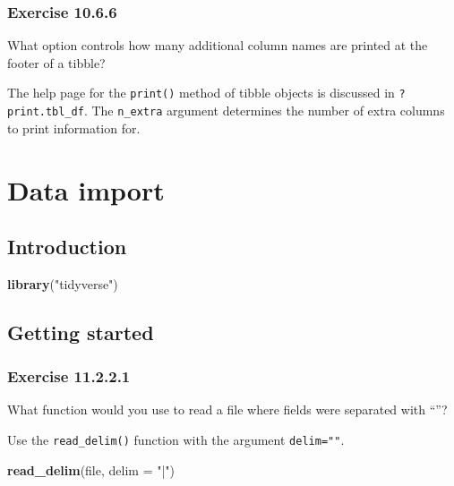 \documentclass[]{book}
\newenvironment{Shaded}{\begin{snugshade}}{\end{snugshade}}
\newcommand{\DataTypeTok}[1]{\textcolor[rgb]{0.13,0.29,0.53}{#1}}
\newcommand{\KeywordTok}[1]{\textcolor[rgb]{0.13,0.29,0.53}{\textbf{#1}}}
\newcommand{\NormalTok}[1]{#1}
\newcommand{\StringTok}[1]{\textcolor[rgb]{0.31,0.60,0.02}{#1}}
\theoremstyle{plain}
\theoremstyle{remark}
\begin{document}
\hypertarget{exercise-10.6.6}{%
\subsection*{\texorpdfstring{Exercise {10.6.6}}{Exercise 10.6.6}}\label{exercise-10.6.6}}

What option controls how many additional column names are printed at the footer of a tibble?

The help page for the \texttt{print()} method of tibble objects is discussed in \texttt{?print.tbl\_df}.
The \texttt{n\_extra} argument determines the number of extra columns to print information for.

\hypertarget{data-import}{%
\chapter{Data import}\label{data-import}}

\hypertarget{introduction-6}{%
\section{Introduction}\label{introduction-6}}

\begin{Shaded}
\begin{Highlighting}[]
\KeywordTok{library}\NormalTok{(}\StringTok{"tidyverse"}\NormalTok{)}
\end{Highlighting}
\end{Shaded}

\hypertarget{getting-started}{%
\section{Getting started}\label{getting-started}}

\hypertarget{exercise-11.2.2.1}{%
\subsection*{\texorpdfstring{Exercise {11.2.2.1}}{Exercise 11.2.2.1}}\label{exercise-11.2.2.1}}

What function would you use to read a file where fields were separated with ``\textbar{}''?

Use the \texttt{read\_delim()} function with the argument \texttt{delim="\textbar{}"}.

\begin{Shaded}
\begin{Highlighting}[]
\KeywordTok{read_delim}\NormalTok{(file, }\DataTypeTok{delim =} \StringTok{"|"}\NormalTok{)}
\end{Highlighting}
\end{Shaded}
\end{document}
